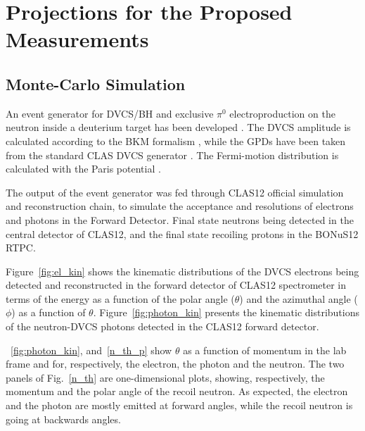 \chapter{Projections for the Proposed Measurements}
\label{chap:reach}

\section{Monte-Carlo Simulation}
An event generator for DVCS/BH and exclusive $\pi^0$ electroproduction on the 
neutron inside a deuterium target has been developed \cite{ahmed}. The DVCS 
amplitude is calculated according to the BKM formalism \cite{Belitsky:2001ns}, 
while the GPDs have been taken from the standard CLAS DVCS generator 
\cite{PhysRevD.60.094017,Guidal:2004nd}.  The Fermi-motion distribution is 
calculated with the Paris potential \cite{PhysRevC.21.861}.

The output of the event generator was fed through CLAS12 official simulation 
and reconstruction chain, to simulate the acceptance and resolutions of 
electrons and photons in the Forward Detector. Final state neutrons being 
detected in the central detector of CLAS12, and the final state recoiling 
protons in the BONuS12 RTPC. 

Figure~\ref{fig:el_kin} shows the kinematic distributions of the DVCS electrons 
being detected and reconstructed in the forward detector of CLAS12 spectrometer 
in terms of the energy as a function of the polar angle ($\theta$) and the 
azimuthal angle ($\phi$) as a function of $\theta$. Figure~\ref{fig:photon_kin} 
presents the kinematic distributions of the neutron-DVCS photons detected in 
the CLAS12 forward detector.



~\ref{fig:photon_kin}, and~\ref{n_th_p} show $\theta$ as a function of momentum 
in the lab frame and for, respectively, the electron, the photon and the 
neutron.  The two panels of Fig.~\ref{n_th} are one-dimensional plots, showing, 
respectively, the momentum and the polar angle of the recoil neutron.  As 
expected, the electron and the photon are mostly emitted at forward angles, 
while the recoil neutron is going at backwards angles.

